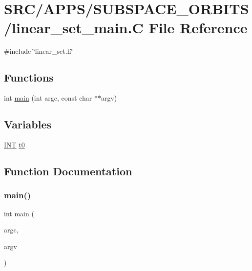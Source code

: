\hypertarget{linear__set__main_8_c}{}\section{S\+R\+C/\+A\+P\+P\+S/\+S\+U\+B\+S\+P\+A\+C\+E\+\_\+\+O\+R\+B\+I\+T\+S/linear\+\_\+set\+\_\+main.C File Reference}
\label{linear__set__main_8_c}
{\ttfamily \#include \char`\"{}linear\+\_\+set.\+h\char`\"{}}\newline
\subsection*{Functions}
\begin{DoxyCompactItemize}
\item 
int \mbox{\hyperlink{linear__set__main_8_c_a217dbf8b442f20279ea00b898af96f52}{main}} (int argc, const char $\ast$$\ast$argv)
\end{DoxyCompactItemize}
\subsection*{Variables}
\begin{DoxyCompactItemize}
\item 
\mbox{\hyperlink{galois_8h_a09fddde158a3a20bd2dcadb609de11dc}{I\+NT}} \mbox{\hyperlink{linear__set__main_8_c_a4268f4fe222ffb119218a0199f5e1904}{t0}}
\end{DoxyCompactItemize}


\subsection{Function Documentation}
\mbox{\label{linear__set__main_8_c_a217dbf8b442f20279ea00b898af96f52}} 
\subsubsection{\texorpdfstring{main()}{main()}}
{\footnotesize\ttfamily int main (\begin{DoxyParamCaption}\item[{int}]{argc,  }\item[{const char $\ast$$\ast$}]{argv }\end{DoxyParamCaption})}



